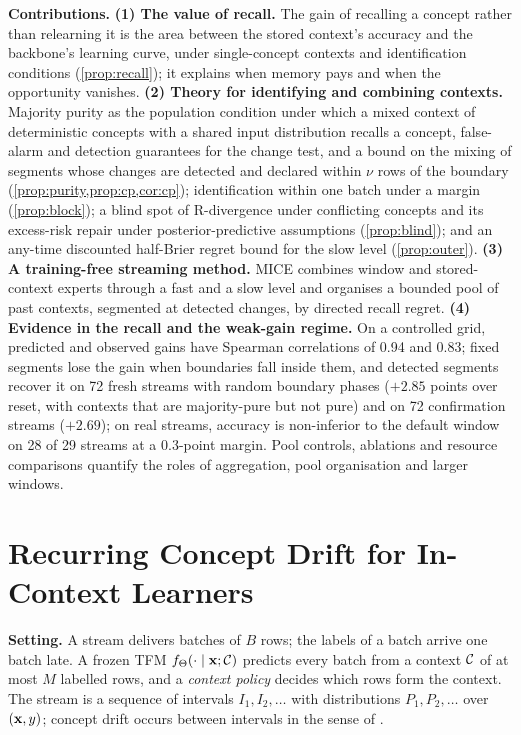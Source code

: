 \documentclass[11pt]{article}
\theoremstyle{plain}
\theoremstyle{definition}
\theoremstyle{remark}
\newcommand{\method}{\textsc{MICE}}   %
\begin{document}
\textbf{Contributions.}
\textbf{(1) The value of recall.} The gain of recalling a concept rather than relearning it is the area between the
stored context's accuracy and the backbone's learning curve, under single-concept contexts and identification
conditions (\cref{prop:recall}); it explains when memory pays and when the opportunity vanishes.
\textbf{(2) Theory for identifying and combining contexts.} Majority purity as the population condition under which a mixed
context of deterministic concepts with a shared input distribution recalls a concept, false-alarm and detection guarantees for the change test, and a bound on the mixing of segments whose changes are
detected and declared within $\nu$ rows of the boundary (\cref{prop:purity,prop:cp,cor:cp}); identification within one batch under a margin (\cref{prop:block}); a blind spot of R-divergence under conflicting concepts and its excess-risk repair under
posterior-predictive assumptions (\cref{prop:blind}); and an any-time discounted half-Brier regret bound for the slow
level (\cref{prop:outer}).
\textbf{(3) A training-free streaming method.} \method{} combines window and stored-context experts through a fast and
a slow level and organises a bounded pool of past contexts, segmented at detected changes, by directed recall regret.
\textbf{(4) Evidence in the recall and the weak-gain regime.} On a controlled grid, predicted and observed gains have
Spearman correlations of 0.94 and 0.83; fixed segments lose the gain when boundaries fall inside them, and detected
segments recover it on 72 fresh streams with random boundary phases ($+2.85$ points over reset, with contexts that are
majority-pure but not pure) and on 72 confirmation streams ($+2.69$); on real streams, accuracy is non-inferior
to the default window on 28 of 29 streams at a 0.3-point margin. Pool controls, ablations and resource comparisons
quantify the roles of aggregation, pool organisation and larger windows.

\section{Recurring Concept Drift for In-Context Learners}
\label{sec:def}

\textbf{Setting.} A stream delivers batches of $B$ rows; the labels of a batch arrive one batch late. A frozen TFM
$f_\Theta(\cdot\mid\mathbf{x};\mathcal{C})$ predicts every batch from a context $\mathcal{C}$ of at most $M$ labelled rows, and a
\emph{context policy} decides which rows form the context. The stream is a sequence of intervals $I_1,I_2,\dots$ with
distributions $P_1,P_2,\dots$ over $(\mathbf{x},y)$; concept drift occurs between intervals in the sense of
\citet{lu2019learning}.
\end{document}
